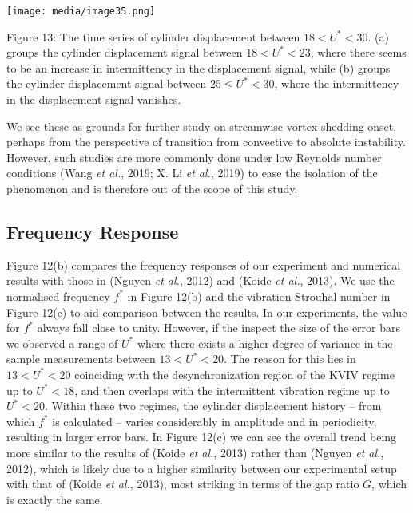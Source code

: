 \documentclass[]{article}
\begin{document}
\texttt{[image: media/image35.png]}

\protect\hypertarget{_Ref41044658}{}{\protect\hypertarget{_Toc41048836}{}{}}Figure
13: The time series of cylinder displacement between
\(18 < U^{*} < 30\). (a) groups the cylinder displacement signal between
\(18 < U^{*} < 23\), where there seems to be an increase in
intermittency in the displacement signal, while (b) groups the cylinder
displacement signal between \(25 \leq U^{*} < 30\), where the
intermittency in the displacement signal vanishes.

We see these as grounds for further study on streamwise vortex shedding
onset, perhaps from the perspective of transition from convective to
absolute instability. However, such studies are more commonly done under
low Reynolds number conditions (Wang \emph{et al.}, 2019; X. Li \emph{et
al.}, 2019) to ease the isolation of the phenomenon and is therefore out
of the scope of this study.

\hypertarget{frequency-response}{\subsection{Frequency
Response}\label{frequency-response}}

Figure 12(b) compares the frequency responses of our experiment and
numerical results with those in (Nguyen \emph{et al.}, 2012) and (Koide
\emph{et al.}, 2013). We use the normalised frequency \(f^{*}\) in
Figure 12(b) and the vibration Strouhal number in Figure 12(c) to aid
comparison between the results. In our experiments, the value for
\(f^{*}\) always fall close to unity. However, if the inspect the size
of the error bars we observed a range of \(U^{*}\) where there exists a
higher degree of variance in the sample measurements between
\(13 < U^{*} < 20\). The reason for this lies in \(13 < U^{*} < 20\)
coinciding with the desynchronization region of the KVIV regime up to
\(U^{*} < 18\), and then overlaps with the intermittent vibration regime
up to \(U^{*} < 20\). Within these two regimes, the cylinder
displacement history -- from which \(f^{*}\) is calculated -- varies
considerably in amplitude and in periodicity, resulting in larger error
bars. In Figure 12(c) we can see the overall trend being more similar to
the results of (Koide \emph{et al.}, 2013) rather than (Nguyen \emph{et
al.}, 2012), which is likely due to a higher similarity between our
experimental setup with that of (Koide \emph{et al.}, 2013), most
striking in terms of the gap ratio \(G\), which is exactly the same.
\end{document}
